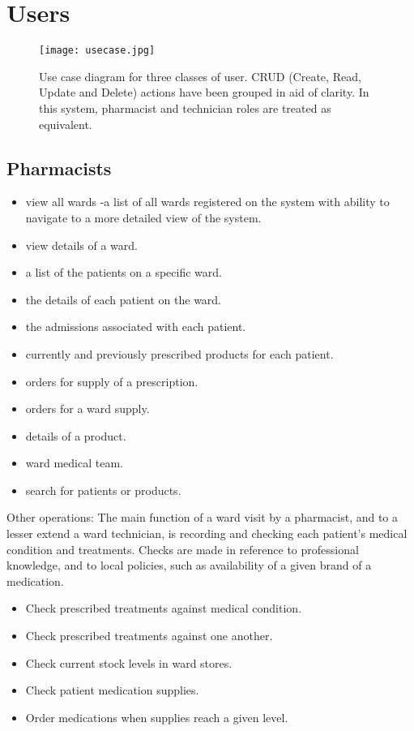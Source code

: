 \documentclass[letterpaper]{amsart}
\begin{document}
\section{Users}
\begin{figure}[]
    \centering
   \texttt{[image: usecase.jpg]}
   \caption{Use case diagram for three classes of user.  CRUD (Create, Read, Update and Delete) actions have been grouped in aid of clarity.  In this system, pharmacist and technician roles are treated as equivalent. }\label{usecase}
\end{figure}

\subsection{Pharmacists}
\begin{itemize}
    \item view all wards -a list of all wards registered on the system with ability to navigate to a more detailed view of the system.
    \item view details of a  ward.
    \item a list of the patients on a specific ward.
    \item the details of each patient on the ward.
    \item the admissions associated with each patient.
    \item currently and previously prescribed products for each patient.
    \item orders for supply of a prescription.
    \item orders for a ward supply.
    \item details of a product.
    \item ward medical team.
    \item search for patients or products. 
\end{itemize}
Other operations:
The main function of a ward visit by a pharmacist, and to a lesser extend a ward technician, is recording and checking each patient's medical condition and treatments.  Checks are made in reference to professional knowledge, and to local policies, such as availability of a given brand of a medication.
\begin{itemize}
    \item Check prescribed treatments against medical condition.
    \item Check prescribed treatments against one another.
    \item Check current stock levels in ward stores.
    \item Check patient medication supplies.
    \item Order medications when supplies reach a given level.
\end{itemize}
\end{document}
